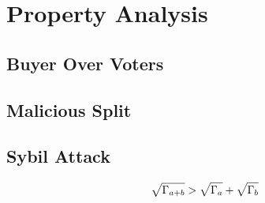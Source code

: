 \section{Property Analysis}
\label{section:properties}
\subsection{Buyer Over Voters}
\begin{property}
	\label{p1}
\end{property}

\begin{corollary}

\end{corollary}

\subsection{Malicious Split}
\label{subsec:5.2}

\begin{property}
	\label{p2}

\end{property}
\begin{corollary}
	\label{c1}
\end{corollary}

\subsection{Sybil Attack}


\begin{align}
	\label{eq:sqrt_nr}
	\sqrt{\Gamma_{a+b}}>\sqrt{\Gamma_a}+\sqrt{\Gamma_b}
\end{align}

\begin{property}
	\label{p3}

\end{property}
